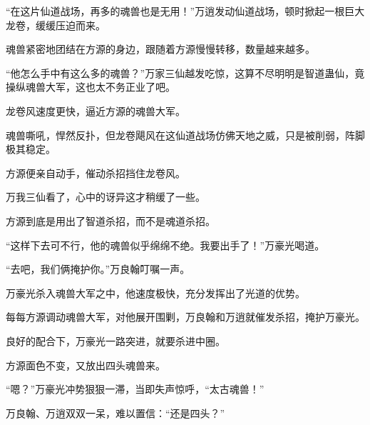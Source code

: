 \begin{this_body}
“在这片仙道战场，再多的魂兽也是无用！”万逍发动仙道战场，顿时掀起一根巨大龙卷，缓缓压迫而来。

魂兽紧密地团结在方源的身边，跟随着方源慢慢转移，数量越来越多。

“他怎么手中有这么多的魂兽？”万家三仙越发吃惊，这算不尽明明是智道蛊仙，竟操纵魂兽大军，这也太不务正业了吧。

龙卷风速度更快，逼近方源的魂兽大军。

魂兽嘶吼，悍然反扑，但龙卷飓风在这仙道战场仿佛天地之威，只是被削弱，阵脚极其稳定。

方源便亲自动手，催动杀招挡住龙卷风。

万我三仙看了，心中的讶异这才稍缓了一些。

方源到底是用出了智道杀招，而不是魂道杀招。

“这样下去可不行，他的魂兽似乎绵绵不绝。我要出手了！”万豪光喝道。

“去吧，我们俩掩护你。”万良翰叮嘱一声。

万豪光杀入魂兽大军之中，他速度极快，充分发挥出了光道的优势。

每每方源调动魂兽大军，对他展开围剿，万良翰和万逍就催发杀招，掩护万豪光。

良好的配合下，万豪光一路突进，就要杀进中圈。

方源面色不变，又放出四头魂兽来。

“嗯？”万豪光冲势狠狠一滞，当即失声惊呼，“太古魂兽！”

万良翰、万逍双双一呆，难以置信：“还是四头？”

\end{this_body}

